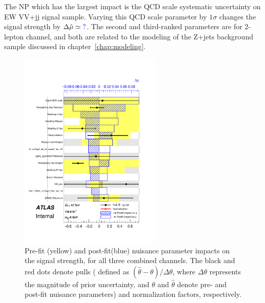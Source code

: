 The NP which has the largest impact is the QCD scale systematic uncertainty on EW VV+jj signal sample. 
Varying this QCD scale parameter by $1\sigma$ changes the signal strength by $\Delta \hat{\mu} \simeq \textcolor{blue}{?}$.
The second and third-ranked parameters are for 2-lepton channel, and both are related to the modeling of the Z+jets background sample discussed in chapter~\ref{chap:modeling}.
\begin{figure}[ht]
      \centering
        \includegraphics[width=0.60\textwidth]{figures/2lep/FitResults/pulls_mu_SemileptonicVBS_5.pdf}
        \caption{Pre-fit (yellow) and post-fit(blue) nuisance parameter impacts on the signal strength, for all three combined channels. The black and red dots denote pulls ( defined as $(\hat{\theta}-\theta) / \Delta \theta$, where $\Delta \theta$ represents the magnitude of prior uncertainty, and $\theta$ and $\hat{\theta}$ denote pre- and post-fit nuisance parameters) and normalization factors, respectively. %
        }
       \label{fig:fit_2lep_ranking_all}
\end{figure}

